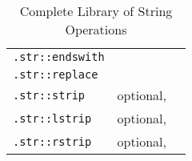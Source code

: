 {\begin{table}[t]
\begin{tabular}{l p{3cm} p{6cm}}
            \lstinline{.str::endswith}                            &                                                                                                                                                                &                      \\
            \lstinline{.str::replace}                             &                                                                                                                                                                &                      \\
            \lstinline{.str::strip}                               & optional,                                                                                                                                                      &                      \\
            \lstinline{.str::lstrip}                              & optional,                                                                                                                                                      &                      \\
            \lstinline{.str::rstrip}                              & optional,                                                                                                                                                      &                      \\
            \bottomrule
        \end{tabular}
        \caption{Complete Library of String Operations}
        \label{tab:strops} %
    \end{table}
}

